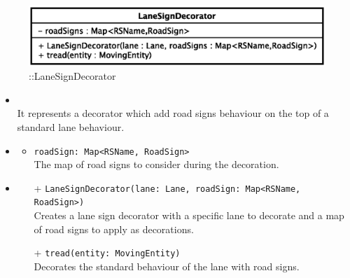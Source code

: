 \begin{figure}[h]
\centering
\includegraphics[scale=0.6,keepaspectratio]{images/solution/lane_sign_decorator.eps}
\caption{\pReactiveComponentLaneDecoration::LaneSignDecorator}
\label{fig:sd-app-lane_sign_decorator}
\end{figure}
\FloatBarrier
\begin{itemize}
  \item \textbf{\descr} \\
    It represents a decorator which add road signs behaviour on the top of a standard lane behaviour. 
  \item \textbf{\attrs}
  \begin{itemize}
    \item \texttt{roadSign: Map<RSName, RoadSign>} \\
The map of road signs to consider during the decoration.
  \end{itemize}
  \item \textbf{\ops}
   \begin{itemize} 
   \item[+] \texttt{LaneSignDecorator(lane: Lane, roadSign: Map<RSName, RoadSign>)} \\
Creates a lane sign decorator with a specific lane to decorate and a map of road signs to apply as decorations.
    \item[+] \texttt{tread(entity: MovingEntity)} \\
Decorates the standard behaviour of the lane with road signs.  
  \end{itemize}
\end{itemize}
